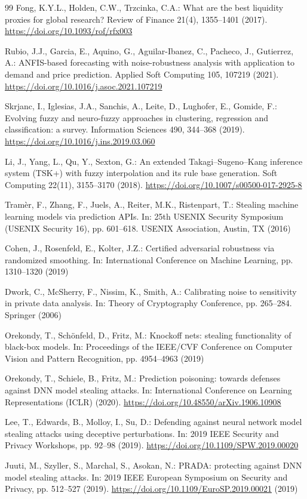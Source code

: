 \documentclass[pdflatex,sn-mathphys-num]{sn-jnl}
\theoremstyle{thmstyleone}
\theoremstyle{thmstyletwo}
\theoremstyle{thmstylethree}
\begin{document}
\begin{thebibliography}{99}
Fong, K.Y.L., Holden, C.W., Trzcinka, C.A.: What are the best liquidity proxies for global research? Review of Finance 21(4), 1355--1401 (2017). \url{https://doi.org/10.1093/rof/rfx003}

Rubio, J.J., Garcia, E., Aquino, G., Aguilar-Ibanez, C., Pacheco, J., Gutierrez, A.: ANFIS-based forecasting with noise-robustness analysis with application to demand and price prediction. Applied Soft Computing 105, 107219 (2021). \url{https://doi.org/10.1016/j.asoc.2021.107219}

Skrjanc, I., Iglesias, J.A., Sanchis, A., Leite, D., Lughofer, E., Gomide, F.: Evolving fuzzy and neuro-fuzzy approaches in clustering, regression and classification: a survey. Information Sciences 490, 344--368 (2019). \url{https://doi.org/10.1016/j.ins.2019.03.060}

Li, J., Yang, L., Qu, Y., Sexton, G.: An extended Takagi--Sugeno--Kang inference system (TSK+) with fuzzy interpolation and its rule base generation. Soft Computing 22(11), 3155--3170 (2018). \url{https://doi.org/10.1007/s00500-017-2925-8}

Tram{\`e}r, F., Zhang, F., Juels, A., Reiter, M.K., Ristenpart, T.: Stealing machine learning models via prediction APIs. In: 25th USENIX Security Symposium (USENIX Security 16), pp. 601--618. USENIX Association, Austin, TX (2016)

Cohen, J., Rosenfeld, E., Kolter, J.Z.: Certified adversarial robustness via randomized smoothing. In: International Conference on Machine Learning, pp. 1310--1320 (2019)

Dwork, C., McSherry, F., Nissim, K., Smith, A.: Calibrating noise to sensitivity in private data analysis. In: Theory of Cryptography Conference, pp. 265--284. Springer (2006)

Orekondy, T., Sch{\"o}nfeld, D., Fritz, M.: Knockoff nets: stealing functionality of black-box models. In: Proceedings of the IEEE/CVF Conference on Computer Vision and Pattern Recognition, pp. 4954--4963 (2019)

Orekondy, T., Schiele, B., Fritz, M.: Prediction poisoning: towards defenses against DNN model stealing attacks. In: International Conference on Learning Representations (ICLR) (2020). \url{https://doi.org/10.48550/arXiv.1906.10908}

Lee, T., Edwards, B., Molloy, I., Su, D.: Defending against neural network model stealing attacks using deceptive perturbations. In: 2019 IEEE Security and Privacy Workshops, pp. 92--98 (2019). \url{https://doi.org/10.1109/SPW.2019.00020}

Juuti, M., Szyller, S., Marchal, S., Asokan, N.: PRADA: protecting against DNN model stealing attacks. In: 2019 IEEE European Symposium on Security and Privacy, pp. 512--527 (2019). \url{https://doi.org/10.1109/EuroSP.2019.00021} (2019)

\end{thebibliography}
\end{document}
